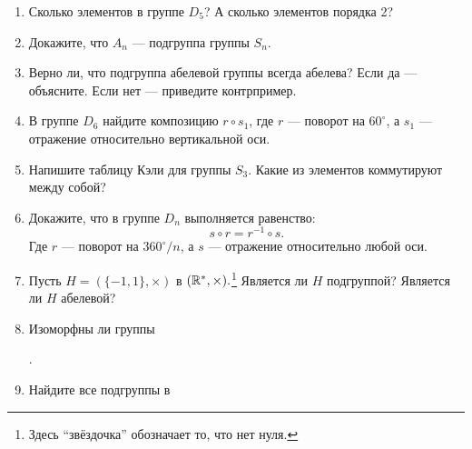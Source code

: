 \begin{enumerate}
    \item Сколько элементов в группе $D_5$? А сколько элементов порядка 2?
    \item Докажите, что $A_n$ --- подгруппа группы $S_n$.
    \item Верно ли, что подгруппа абелевой группы всегда абелева? Если да — объясните. Если нет — приведите контрпример.
    \item В группе $D_6$ найдите композицию $r \circ s_1$, где $r$ --- поворот на $60^\circ$, а $s_1$ --- отражение относительно вертикальной оси.
    \item Напишите таблицу Кэли для группы $S_3$. Какие из элементов коммутируют между собой?
    \item Докажите, что в группе $D_n$ выполняется равенство: \[
            s \circ r = r^{-1} \circ s.
        \]
        Где $r$ --- поворот на $360^\circ/n$, а $s$ --- отражение относительно любой оси.
    \item Пусть $H = (\{-1, 1\}, \times)$ в $(\mathbb R^*, \times).$\footnote{Здесь ``звёздочка'' обозначает то, что нет нуля.} Является ли $H$ подгруппой? Является ли $H$ абелевой?
    \item Изоморфны ли группы
        .
    \item Найдите все подгруппы в 
\end{enumerate}
